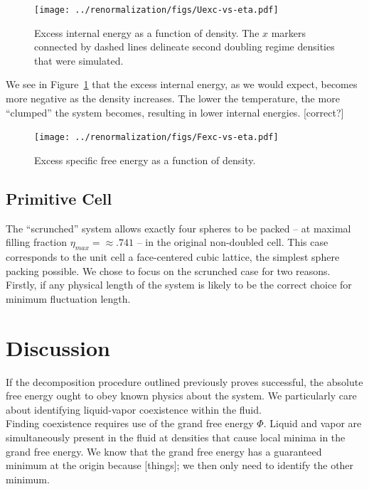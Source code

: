 \documentclass[12pt]{article}
\begin{document}
\begin{figure}
    \centering
    \texttt{[image: ../renormalization/figs/Uexc-vs-eta.pdf]}
    \caption{Excess internal energy as a function of density. The $x$ markers connected by dashed lines delineate second doubling regime densities that were simulated.}
    \label{U-eta}
\end{figure}
We see in Figure~\ref{U-eta} that the excess internal energy, as we would expect, becomes more negative as the density increases. The lower the temperature, the more ``clumped'' the system becomes, resulting in lower internal energies. [correct?]

\begin{figure}
\centering
    \texttt{[image: ../renormalization/figs/Fexc-vs-eta.pdf]}
    \caption{Excess specific free energy as a function of density.}
    \label{F-eta}
\end{figure}

\subsection{Primitive Cell}
The ``scrunched'' system allows exactly four spheres to be packed -- at maximal filling fraction $\eta_{max} = \approx .741$ -- in the original non-doubled cell. This case corresponds to the unit cell a face-centered cubic lattice, the simplest sphere packing possible. We chose to focus on the scrunched case for two reasons. Firstly, if any physical length of the system is likely to be the correct choice for minimum fluctuation length.


\section{Discussion}
If the decomposition procedure outlined previously proves successful, the absolute free energy ought to obey known physics about the system.
We particularly care about identifying liquid-vapor coexistence within the fluid. \\

Finding coexistence requires use of the grand free energy $\Phi$. Liquid and vapor are simultaneously present in the fluid at densities that cause local minima in the grand free energy. We know that the grand free energy has a guaranteed minimum at the origin because [things]; we then only need to identify the other minimum.  \\
\end{document}
